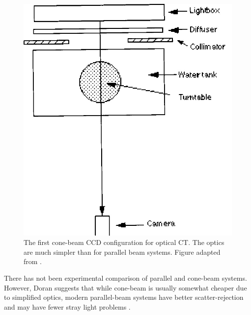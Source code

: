 	
	\begin{figure}[H]
		\centering
		\includegraphics[scale=0.3]{intro_img/Wolodzko_1999_conesetup.jpg}
		\caption{The first cone-beam CCD configuration for optical CT. The optics are much simpler than for parallel beam systems. Figure adapted from \cite{Wolodzko:1999}.}
	\end{figure}
	
	
	There has not been experimental comparison of parallel and cone-beam systems. However,  Doran suggests that while cone-beam is usually somewhat cheaper due to simplified optics, modern parallel-beam systems have better scatter-rejection and may have fewer stray light problems \cite{Doran:2008kh, Olding:2011eta, Thomas:2011eja}.
	
	
	
	
	
	
	
	
	
	
	
